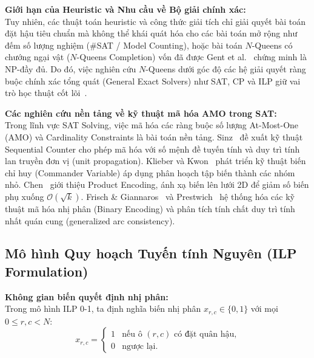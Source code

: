 \documentclass[a4paper,fleqn]{cas-sc}
\begin{document}
\noindent\textbf{Giới hạn của Heuristic và Nhu cầu về Bộ giải chính xác:}\\
Tuy nhiên, các thuật toán heuristic và công thức giải tích chỉ giải quyết bài toán đặt hậu tiêu chuẩn mà không thể khái quát hóa cho các bài toán mở rộng như đếm số lượng nghiệm (\#SAT / Model Counting), hoặc bài toán $N$-Queens có chướng ngại vật ($N$-Queens Completion) vốn đã được Gent et al.~\cite{gent2017complexity} chứng minh là NP-đầy đủ. Do đó, việc nghiên cứu $N$-Queens dưới góc độ các hệ giải quyết ràng buộc chính xác tổng quát (General Exact Solvers) như SAT, CP và ILP giữ vai trò học thuật cốt lõi~\cite{rossi2006handbook,biere2021handbook}. 

\noindent\textbf{Các nghiên cứu nền tảng về kỹ thuật mã hóa AMO trong SAT:}\\
Trong lĩnh vực SAT Solving, việc mã hóa các ràng buộc số lượng At-Most-One (AMO) và Cardinality Constraints là bài toán nền tảng. Sinz~\cite{sinz2005towards} đề xuất kỹ thuật Sequential Counter cho phép mã hóa với số mệnh đề tuyến tính và duy trì tính lan truyền đơn vị (unit propagation). Klieber và Kwon~\cite{klieber2007efficient} phát triển kỹ thuật biến chỉ huy (Commander Variable) áp dụng phân hoạch tập biến thành các nhóm nhỏ. Chen~\cite{chen2010product} giới thiệu Product Encoding, ánh xạ biến lên lưới 2D để giảm số biến phụ xuống $\mathcal{O}(\sqrt{k})$. Frisch \& Giannaros~\cite{frisch2010sat} và Prestwich~\cite{prestwich2009cnf} hệ thống hóa các kỹ thuật mã hóa nhị phân (Binary Encoding) và phân tích tính chất duy trì tính nhất quán cung (generalized arc consistency).

\subsection{Mô hình Quy hoạch Tuyến tính Nguyên (ILP Formulation)}

\noindent\textbf{Không gian biến quyết định nhị phân:}\\
Trong mô hình ILP 0-1, ta định nghĩa biến nhị phân $x_{r,c} \in \{0, 1\}$ với mọi $0 \le r, c < N$:
\begin{equation}
    x_{r,c} = \begin{cases}
        1 & \text{nếu ô } (r, c) \text{ có đặt quân hậu,} \\
        0 & \text{ngược lại.}
    \end{cases}
\end{equation}
\end{document}
